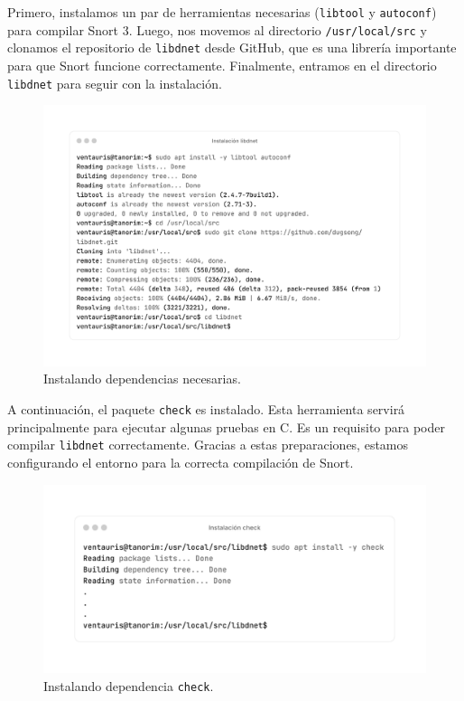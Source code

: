 \documentclass[12pt,a4paper]{report}
\begin{document}
Primero, instalamos un par de herramientas necesarias (\texttt{libtool} y \texttt{autoconf}) para compilar Snort 3. Luego, nos movemos al directorio \texttt{/usr/local/src} y clonamos el repositorio de \texttt{libdnet} desde GitHub, que es una librería importante para que Snort funcione correctamente. Finalmente, entramos en el directorio \texttt{libdnet} para seguir con la instalación.

\begin{figure}[H]
	\centering
	\includegraphics[scale=0.12]{instalacion_snort/1-1.png}
	\caption{Instalando dependencias necesarias.}
\end{figure}

\newpage

A continuación, el paquete \texttt{check} es instalado. Esta herramienta servirá principalmente para ejecutar algunas pruebas en C. Es un requisito para poder compilar \texttt{libdnet} correctamente. Gracias a estas preparaciones, estamos configurando el entorno para la correcta compilación de Snort.

\begin{figure}[H]
	\centering
	\includegraphics[scale=0.12]{instalacion_snort/2-2.png}
	\caption{Instalando dependencia \texttt{check}.}
\end{figure}
\end{document}
